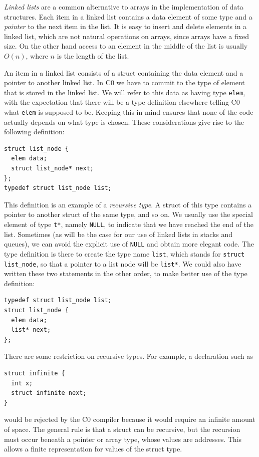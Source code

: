 \emph{Linked lists} are a common alternative to arrays in the
implementation of data structures.  Each item in a linked list
contains a data element of some type and a \emph{pointer} to the next
item in the list.  It is easy to insert and delete elements in a
linked list, which are not natural operations on arrays, since arrays
have a fixed size.  On the other hand access to an element in the
middle of the list is usually $O(n)$, where $n$ is the length of the
list.

An item in a linked list consists of a struct containing the data
element and a pointer to another linked list.  In C0 we have to commit
to the type of element that is stored in the linked list.  We will
refer to this data as having type \lstinline'elem', with the expectation
that there will be a type definition elsewhere telling C0 what
\lstinline'elem' is supposed to be. Keeping this in mind ensures that none
of the code actually depends on what type is chosen. These
considerations give rise to the following definition:

\begin{lstlisting}[language={[C0]C}]
struct list_node {
  elem data;
  struct list_node* next;
};
typedef struct list_node list;
\end{lstlisting}

This definition is an example of a \emph{recursive type}.  A struct of
this type contains a pointer to another struct of the same type, and
so on.  We usually use the special element of type \lstinline't*', namely
\lstinline'NULL', to indicate that we have reached the end of the list.
Sometimes (as will be the case for our use of linked lists in stacks
and queues), we can avoid the explicit use of \lstinline'NULL' and obtain
more elegant code.  The type definition is there to create the type
name \lstinline'list', which stands for \lstinline'struct list_node', so that a
pointer to a list node will be \lstinline'list*'. We could also have
written these two statements in the other order, to make better use of
the type definition:

\begin{lstlisting}[language={[C0]C}]
typedef struct list_node list;
struct list_node {
  elem data;
  list* next;
};
\end{lstlisting}

There are some restriction on recursive types.  For example,
a declaration such as
\begin{lstlisting}[language={[C0]C}]
struct infinite {
  int x;
  struct infinite next;
}
\end{lstlisting}
would be rejected by the C0 compiler because it would require an
infinite amount of space.  The general rule is that a struct can be
recursive, but the recursion must occur beneath a pointer or array
type, whose values are addresses.  This allows a finite representation
for values of the struct type.

